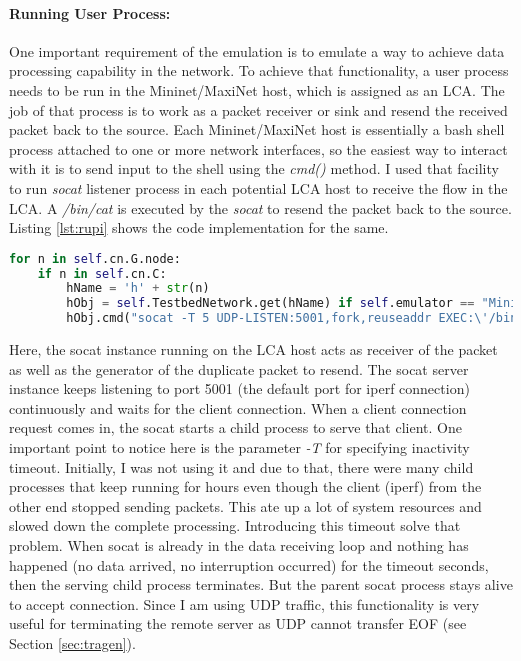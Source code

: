 \paragraph{Running User Process:}
One important requirement of the emulation is to emulate a way to achieve data processing capability in the network. To achieve that functionality, a user process needs to be run in the Mininet/MaxiNet host, which is assigned as an LCA. The job of that process is to work as a packet receiver or sink and resend the received packet back to the source. Each Mininet/MaxiNet host is essentially a bash shell process attached to one or more network interfaces, so the easiest way to interact with it is to send input to the shell using the \textit{cmd()} method. I used that facility to run \textit{socat} listener process in each potential LCA host to receive the flow in the LCA. A \textit{/bin/cat} is executed by the \textit{socat} to resend the packet back to the source. Listing \ref{lst:rupi} shows the code implementation for the same.

\begin{lstlisting}[caption={Running user process implementation},label={lst:rupi},language=Python,tabsize=2,basicstyle=\footnotesize,breaklines=true, showspaces=false,showstringspaces=false,showtabs=false,frame=single]
for n in self.cn.G.node:
	if n in self.cn.C:
		hName = 'h' + str(n)
		hObj = self.TestbedNetwork.get(hName) if self.emulator == "Mininet" else self.TestbedNetwork.get_node(hName)
		hObj.cmd("socat -T 5 UDP-LISTEN:5001,fork,reuseaddr EXEC:\'/bin/cat\' &")
\end{lstlisting}

Here, the socat instance running on the LCA host acts as receiver of the packet as well as the generator of the duplicate packet to resend. The socat server instance keeps listening to port 5001 (the default port for iperf connection) continuously and waits for the client connection. When a client connection request comes in, the socat starts a child process to serve that client. One important point to notice here is the parameter \textit{-T} for specifying inactivity timeout. Initially, I was not using it and due to that, there were many child processes that keep running for hours even though the client (iperf) from the other end stopped sending packets. This ate up a lot of system resources and slowed down the complete processing. Introducing this timeout solve that problem. When socat is already in the data receiving loop and nothing has happened (no data arrived, no interruption occurred) for the timeout seconds, then the serving child process terminates. But the parent socat process stays alive to accept connection. Since I am using UDP traffic, this functionality is very useful for terminating the remote server as UDP cannot transfer EOF (see Section \ref{sec:tragen}).

